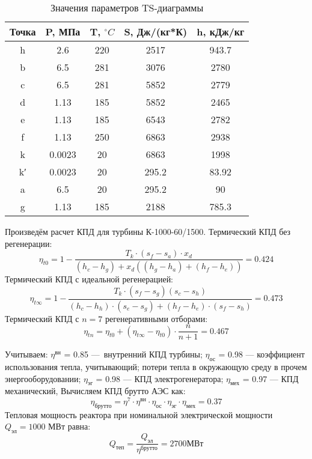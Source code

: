 \begin{table}[H]
	\caption{Значения параметров TS-диаграммы}
	\begin{center}
        \begin{tabular}{|c|c|c|c|c|}
        \toprule
         Точка & P, МПа & T, $^\circ C$ & S, Дж/(кг*К) & h, кДж/кг \\ 
         \midrule
         \hline
          h &  2.6 & 220 & 2517 & 943.7\\ 
         \hline
          b & 6.5 & 281 & 3076 & 2780 \\ 
         \hline
          c & 6.5 & 281 & 5852 & 2779\\ 
         \hline
          d & 1.13 & 185 & 5852 & 2465 \\ 
         \hline
          e & 1.13 & 185 & 6543 & 2782 \\ 
         \hline
          f & 1.13 & 250  & 6863 & 2938 \\ 
         \hline
          k & 0.0023 & 20 & 6863 & 1998 \\ 
         \hline
          k′ & 0.0023 & 20 & 295.2 & 83.92 \\ 
         \hline
          a & 6.5 & 20 & 295.2 & 90 \\ 
         \hline
          g & 1.13 & 185 & 2188 & 785.3 \\ 
         \bottomrule
		\end{tabular}
		\label{tabular:coeffs}
	\end{center}
\end{table}

Произведём расчет КПД для турбины К-1000-60/1500. Термический КПД без регенерации:
$$
η_{t0} = 1 -
\frac{T_{k} ⋅ \left( s_{f} - s_{a} \right) ⋅ x_{d}}
{\left( h_{c} - h_{g} \right) +x_{d}\left( \left( h_{g} - h_{a} \right) + \left( h_{f} - h_{e} \right) \right)} = 0.424
$$
Термический КПД с идеальной регенерацией:
$$
η_{t∞} = 1 -
\frac{T_{k} ⋅ \left( s_{f} - s_{g} \right) \left( s_{c} - s_{h} \right)}
{\left(h_{c} - h_{h}\right) ⋅ \left( s_{e} - s_{g} \right) + \left( h_{f} - h_{e} \right) ⋅ \left( s_{f} - s_{h} \right)} = 0.473
$$
Термический КПД с $n = 7$  регенеративными отборами:
$$
η_{tn} = η_{t0} + \left( η_{t∞} - η_{t0} \right) ⋅ \frac{n}{n+1} = 0.467
$$

Учитываем:
$\eta^{\text{вн}}$ = 0.85 — внутренний КПД турбины;
$\eta_{\text{ос}}$ = 0.98 — коэффициент использования тепла, учитывающий; потери тепла в окружающую среду в прочем энергооборудовании;
$\eta_{\text{эг}}$ = 0.98 — КПД электрогенератора;
$\eta_{\text{мех}}$ = 0.97 — КПД механический,
Вычисляем КПД брутто АЭС как:
$$
\eta_{\text{брутто}} = \eta^7 \cdot \eta^{\text{вн}} \cdot \eta_{\text{ос}} \cdot \eta_{\text{эг}} \cdot \eta_{\text{мех}} = 0.37
$$
Тепловая мощность реактора при номинальной электрической мощности $Q_{\text{эл}} = 1000$ МВт равна:
$$
Q_{\text{теп}} = \frac {Q_{\text{эл}}} {\eta^{\text{брутто}}} = 2700 МВт 
$$


